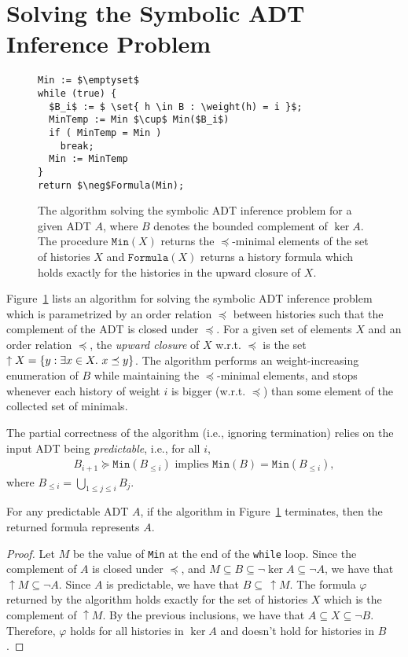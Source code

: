 \section{Solving the Symbolic ADT Inference Problem}

\begin{figure}
\begin{lstlisting}
Min := $\emptyset$
while (true) {
  $B_i$ := $ \set{ h \in B : \weight(h) = i }$;
  MinTemp := Min $\cup$ Min($B_i$)
  if ( MinTemp = Min )
    break;
  Min := MinTemp
}
return $\neg$Formula(Min);
\end{lstlisting}
\caption{The algorithm solving the symbolic ADT inference problem for a given ADT $A$, where $B$ denotes the bounded complement of $\ker A$. The procedure $\texttt{Min}(X)$ returns the $\preceq$-minimal elements of the set of histories $X$ and $\texttt{Formula}(X)$ returns a history formula which holds exactly for the histories in the upward closure of $X$.} 
\label{fig:algorithm}
\end{figure}

Figure~\ref{fig:algorithm} lists an algorithm for solving the symbolic ADT inference problem which is parametrized by 
an order relation $\preceq$ between histories such that the complement of the ADT 
is closed under $\preceq$. For a given set of elements $X$ and an order relation $\preceq$, the \emph{upward closure}
of $X$ w.r.t. $\preceq$ is the set $\uparrow X={\{{y : \exists x\in X.\ x\preceq y}\}}$. The algorithm performs an
weight-increasing enumeration of $B$ while maintaining the
$\preceq$-minimal elements, and stops whenever each history of weight $i$ is bigger (w.r.t. $\preceq$) than some
element of the collected set of minimals.

The partial correctness of the algorithm (i.e., ignoring termination) relies on the input ADT being \emph{predictable}, i.e.,
for all $i$,
\begin{align*}
B_{i+1} \succeq \texttt{Min}(B_{\leq i}) \mbox{ implies } \texttt{Min}(B) = \texttt{Min}(B_{\leq i}),
\end{align*}
where $B_{\leq i}=\bigcup_{1\leq j\leq i}B_j$.

\begin{theorem}\label{th:corr1}
For any predictable ADT $A$, if the algorithm in Figure~\ref{fig:algorithm} terminates, then the returned formula represents $A$.
\end{theorem}
\begin{proof}
Let $M$ be the value of \texttt{Min} at the end of the \texttt{while} loop.
Since the complement of $A$ is closed under $\preceq$, and $M\subseteq B\subseteq  \neg \ker A \subseteq \neg A$, we have that $\uparrow M\subseteq \neg A$. 
Since $A$ is predictable, we have that $B \subseteq\, \uparrow M$.
The formula $\varphi$ returned by the algorithm holds exactly for the set of histories $X$ 
which is the complement of $\uparrow M$. By the previous inclusions, we have that $A\subseteq X\subseteq \neg B$.
Therefore, $\varphi$ holds for all histories in $\ker A$ and doesn't hold for histories in $B$. 
\end{proof}

